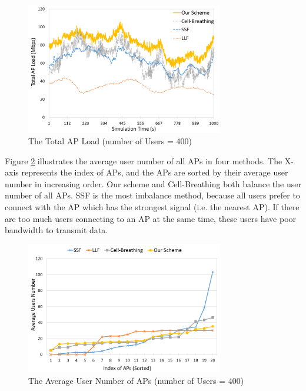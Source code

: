 \begin{figure}[tbp]
\begin{center}
\includegraphics[width=3.4in]{images/Total_AP_load.png}
\end{center}
\caption{The Total AP Load (number of Users = 400)}
\label{fig:Total-AP-load}
\end{figure}

Figure \ref{fig:Average-user-number} illustrates the average user number of all APs in four methods. The X-axis represents the index of APs, and the APs are sorted by their average user number in increasing order. Our scheme and Cell-Breathing both balance the user number of all APs. SSF is the most imbalance method, because all users prefer to connect with the AP which has the strongest signal (i.e. the nearest AP). If there are too much users connecting to an AP at the same time, these users have poor bandwidth to transmit data.

\begin{figure}[tbp]
\begin{center}
\includegraphics[width=3.4in]{images/Average_user_number.png}
\end{center}
\caption{The Average User Number of APs (number of Users = 400)}
\label{fig:Average-user-number}
\end{figure}

